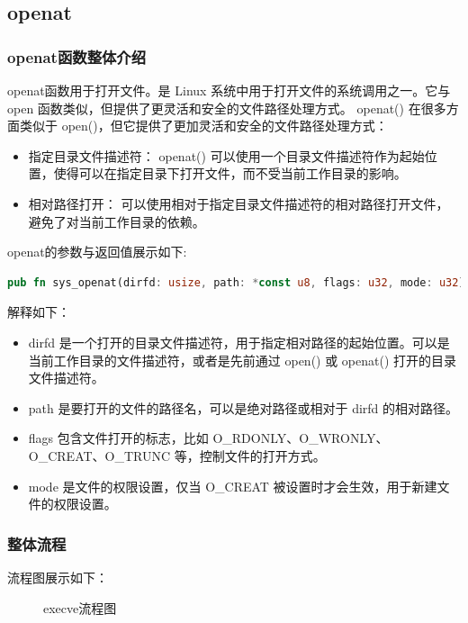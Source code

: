 \subsection{openat}

\subsubsection{openat函数整体介绍}
openat函数用于打开文件。是 Linux 系统中用于打开文件的系统调用之一。它与 open 函数类似，但提供了更灵活和安全的文件路径处理方式。
openat() 在很多方面类似于 open()，但它提供了更加灵活和安全的文件路径处理方式：
\begin{itemize}
    \item 指定目录文件描述符： openat() 可以使用一个目录文件描述符作为起始位置，使得可以在指定目录下打开文件，而不受当前工作目录的影响。
    \item 相对路径打开： 可以使用相对于指定目录文件描述符的相对路径打开文件，避免了对当前工作目录的依赖。
\end{itemize}
openat的参数与返回值展示如下:
\begin{lstlisting}[language={Rust}, 
    caption={openat的参数与返回值}]
pub fn sys_openat(dirfd: usize, path: *const u8, flags: u32, mode: u32) -> isize
\end{lstlisting}
解释如下：
\begin{itemize}
    \item dirfd 是一个打开的目录文件描述符，用于指定相对路径的起始位置。可以是当前工作目录的文件描述符，或者是先前通过 open() 或 openat() 打开的目录文件描述符。
    \item path 是要打开的文件的路径名，可以是绝对路径或相对于 dirfd 的相对路径。
    \item flags 包含文件打开的标志，比如 O_RDONLY、O_WRONLY、O_CREAT、O_TRUNC 等，控制文件的打开方式。
    \item mode 是文件的权限设置，仅当 O_CREAT 被设置时才会生效，用于新建文件的权限设置。
\end{itemize}

\subsubsection{整体流程}
流程图展示如下：
\begin{figure}[H]
    \centering
    \caption{execve流程图}
\end{figure}


